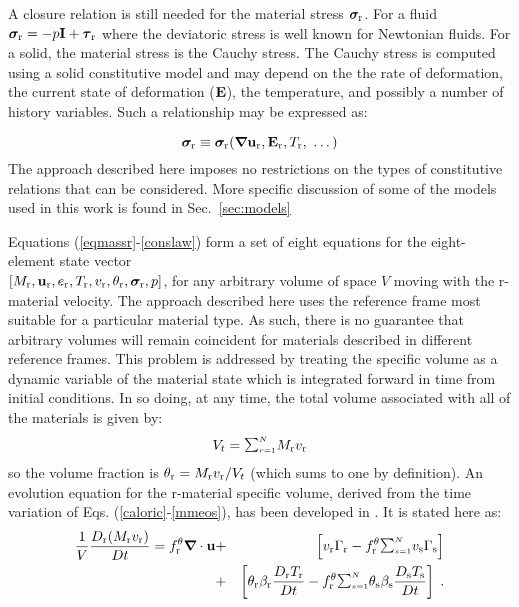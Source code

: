 A closure relation is still needed for the material stress $\mbox{\boldmath $\sigma \!\!$ \unboldmath}_{\rm r}$.
For a fluid $\mbox{\boldmath $\sigma \!\!$ \unboldmath}_{\rm r} = -p{\bf I} + \mbox{\boldmath $\tau \!\!$ \unboldmath}_{\rm r}$ where the deviatoric stress
is well known for Newtonian fluids.  For a solid, the material stress is the
Cauchy stress.  The Cauchy stress is computed using a solid constitutive
model and may depend on the the rate of deformation, the current state of
deformation (${\bf E}$), the temperature, and possibly a number of history
variables.  Such a relationship may be expressed as:

%
\begin{equation}
{\mbox{\boldmath $\sigma \!\!$ \unboldmath}}_{\rm r} \equiv \mbox{\boldmath $\sigma \!\!$ \unboldmath}_{\rm r}(\mbox{\boldmath $\nabla \!\!$ \unboldmath}{\bf u}_{\rm r}, {\bf E}_{\rm r}, T_{\rm r},~ \dots)
\label{conslaw}
\end{equation}
%
The approach described here imposes no restrictions on the types of constitutive relations
that can be considered.  More specific discussion of some of the models
used in this work is found in Sec.~\ref{sec:models}

Equations (\ref{eqmassr}-\ref{conslaw}) form a set of eight equations for
the eight-element state vector \\ $[M_{\rm r}, {\bf u}_{\rm r}, e_{\rm r}, T_{\rm r},
v_{\rm r}, \theta_{\rm r}, \mbox{\boldmath $\sigma \!\!$ \unboldmath}_{\rm r}, p]$, for any arbitrary volume of space $V$
moving with the r-material velocity.  The approach described here uses the
reference frame most suitable for a particular material type.  As such,
there is no guarantee that arbitrary volumes will remain coincident for
materials described in different reference frames.  This problem is addressed
by treating the specific volume as a dynamic variable of the material state
which is integrated forward in time from initial conditions.  In so doing,
at any time, the total volume associated with all of the materials is given by:
%
\begin{eqnarray}
V_t = {\raise1.5pt\hbox{$\scriptstyle\sum_{r=1}^N$}} M_\rmr v_\rmr
\end{eqnarray}
%
so the volume fraction is $\theta_{\rm r} = M_{\rm r} v_{\rm r} / V_t$ (which sums
to one by definition).  An evolution equation for the r-material specific
volume, derived from the time variation of Eqs. (\ref{caloric}-\ref{mmeos}),
has been developed in \cite{kashiwa2000}.  It is stated here as:
%
\begin{eqnarray}
{1\over V}{D_\rmr (M_\rmr v_\rmr) \over Dt} =
f_\rmr^{\theta} \bnabla \cdot \bfu &+&
\left[v_\rmr \Gamma_\rmr -
f_\rmr^{\theta} \SUM
v_\rms \Gamma_\rms \right]  \nonumber \\ &+&
\left[\theta_\rmr
\beta_\rmr {D_\rmr T_\rmr\over Dt} -
f_\rmr^{\theta} \SUM
\theta_\rms \beta_\rms {D_\rms T_\rms\over Dt} \right] \; .
\label{eqspvolr}
\end{eqnarray}

